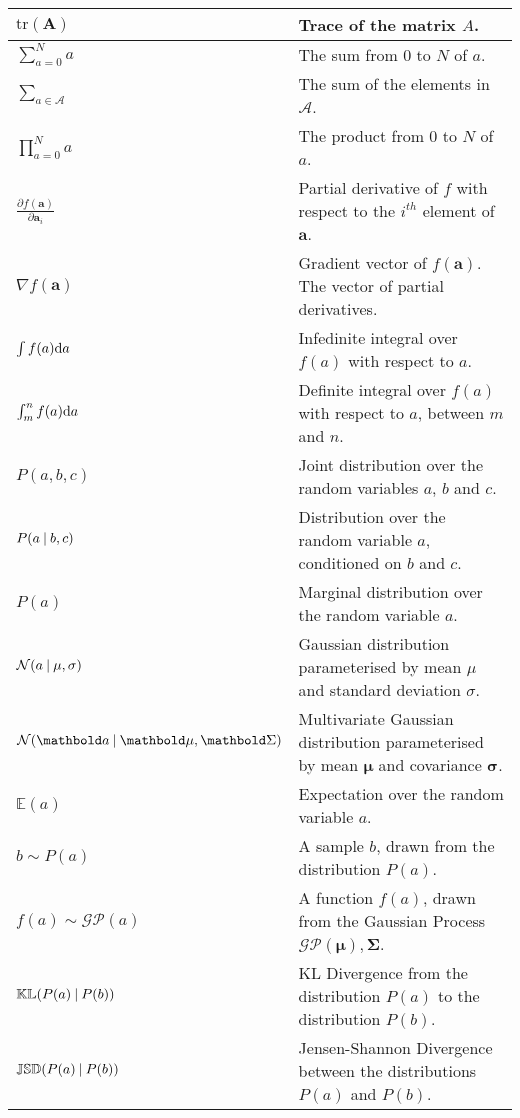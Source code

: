 \begin{longtable}{p{} | p{}}
  \( \text{tr}(\bm{A}) \) & Trace of the matrix \( A \).\\
  \hline
  \(\sum_{a = 0}^{N} a\) & The sum from \( 0 \) to \( N \) of \( a \).\\
  \(\sum_{a \in \mathcal{A}}\) & The sum of the elements in \( \mathcal{A} \).\\
  \(\prod_{a = 0}^{N} a\) & The product from \( 0 \) to \( N \) of \( a \).\\
  \hline
  \( \frac{\partial f(\bm{a})}{\partial \bm{a}_{i}} \) & Partial derivative of \( f \) with respect to the \( i^{th} \) element of \( \bm{a} \).\\
  \( \nabla f(\bm{a}) \) & Gradient vector of \( f(\bm{a}) \). The vector of partial derivatives.\\
  \( \int f(a) {\mathrm d{a}} \) & Infedinite integral over \( f(a) \) with respect to \( a \).\\
  \( \int_{m}^{n} f(a) {\mathrm d{a}} \) & Definite integral over \( f(a) \) with respect to \( a \), between \( m \) and \( n \).\\
  \hline
  \( P(a, b, c) \) & Joint distribution over the random variables \( a \), \( b \) and \( c \).\\
  \( P(a \:\vert\: b, c) \) & Distribution over the random variable \( a \), conditioned on \( b \) and \( c \).\\
  \( P(a) \) & Marginal distribution over the random variable \( a \).\\
  \( \mathcal{N}(a \:\vert\: \mu, \sigma) \) & Gaussian distribution parameterised by mean \( \mu \) and standard deviation \( \sigma \).\\
  \( \mathcal{N}(\bm{a} \given \bm{\mu}, \bm{\Sigma}) \) & Multivariate Gaussian distribution parameterised by mean \( \bm{\mu} \) and covariance \( \bm{\sigma} \).\\
  \( \mathbb{E}(a) \) & Expectation over the random variable \( a \).\\
  \( b \sim P(a) \) & A sample \( b \), drawn from the distribution \( P(a) \).\\
  \( f(a) \sim \mathcal{GP}(a) \) & A function \( f(a) \), drawn from the Gaussian Process \( \mathcal{GP}(\bm{\mu}), \bm{\Sigma} \).\\
  \( \mathbb{KL}(P(a) \:\vert\: P(b)) \) & KL Divergence from the distribution \( P(a) \) to the distribution \( P(b) \).\\
  \( \mathbb{JSD}(P(a) \:\vert\: P(b)) \) & Jensen-Shannon Divergence between the distributions \( P(a) \) and \( P(b) \).
~\label{table:mathematical_notation}
\end{longtable}

